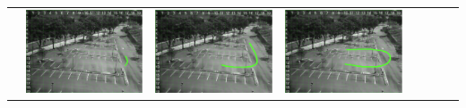 \begin{landscape}
\begin{table}[]
{\begin{tabular}{|l||l|l|l|l|l|l|l|}
 & \includegraphics[scale=0.25]{image/suppResults/q3.PNG}
 & \includegraphics[scale=0.25]{image/suppResults/q4.PNG}
 & \includegraphics[scale=0.25]{image/suppResults/q5.PNG}

\end{tabular}}
\end{table}
\end{landscape}
